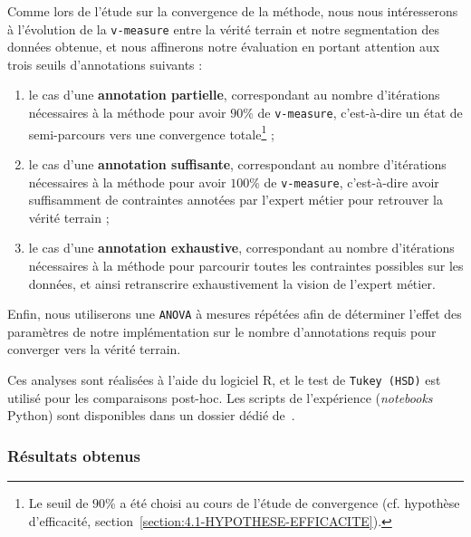 			Comme lors de l'étude sur la convergence de la méthode, nous nous intéresserons à l'évolution de la \texttt{v-measure} entre la vérité terrain et notre segmentation des données obtenue, et nous affinerons notre évaluation en portant attention aux trois seuils d'annotations suivants :
			\begin{enumerate}
				\item le cas d'une \textbf{annotation partielle}, correspondant au nombre d'itérations nécessaires à la méthode pour avoir $90$\% de \texttt{v-measure}, c'est-à-dire un état de semi-parcours vers une convergence totale\footnote{Le seuil de $90$\% a été choisi au cours de l'étude de convergence (cf. hypothèse d'efficacité, section~\ref{section:4.1-HYPOTHESE-EFFICACITE}).} ;
				\item le cas d'une \textbf{annotation suffisante}, correspondant au nombre d'itérations nécessaires à la méthode pour avoir $100$\% de \texttt{v-measure}, c'est-à-dire avoir suffisamment de contraintes annotées par l'expert métier pour retrouver la vérité terrain ;
				\item le cas d'une \textbf{annotation exhaustive}, correspondant au nombre d'itérations nécessaires à la méthode pour parcourir toutes les contraintes possibles sur les données, et ainsi retranscrire exhaustivement la vision de l'expert métier.
			\end{enumerate}
			
			Enfin, nous utiliserons une \texttt{ANOVA} à mesures répétées afin de déterminer l’effet des paramètres de notre implémentation sur le nombre d’annotations requis pour converger vers la vérité terrain.
			
			\begin{leftBarInformation}
				Ces analyses sont réalisées à l'aide du logiciel R, et le test de \texttt{Tukey (HSD)} est utilisé pour les comparaisons post-hoc.
				Les scripts de l'expérience (\textit{notebooks} Python) sont disponibles dans un dossier dédié de~\cite{schild:cognitivefactory-interactive-clustering-comparative-study:2021}.
			\end{leftBarInformation}

		\subsubsection{Résultats obtenus}
		
